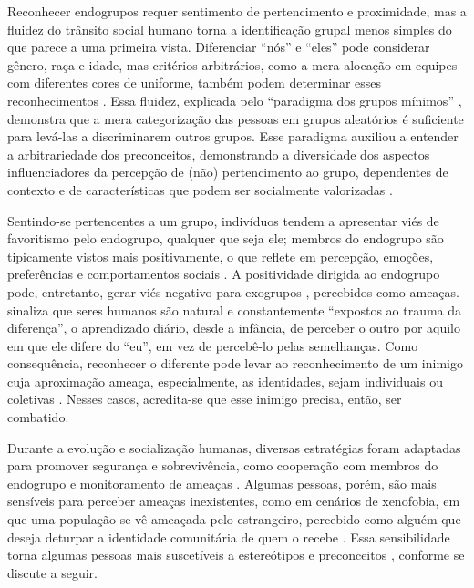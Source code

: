 \documentclass[portuguese]{textolivre}
\begin{document}
Reconhecer endogrupos requer sentimento de pertencimento e proximidade, mas a fluidez do trânsito social humano torna a identificação grupal menos simples do que parece a uma primeira vista. Diferenciar “nós” e “eles” pode considerar gênero, raça e idade, mas critérios arbitrários, como a mera alocação em equipes com diferentes cores de uniforme, também podem determinar esses reconhecimentos \cite{van2008neural}. Essa fluidez, explicada pelo “paradigma dos grupos mínimos” \cite{tajfel1974social}, demonstra que a mera categorização das pessoas em grupos aleatórios é suficiente para levá-las a discriminarem outros grupos. Esse paradigma auxiliou a entender a arbitrariedade dos preconceitos, demonstrando a diversidade dos aspectos influenciadores da percepção de (não) pertencimento ao grupo, dependentes de contexto e de características que podem ser socialmente valorizadas \cite{cikara2022hate}.

Sentindo-se pertencentes a um grupo, indivíduos tendem a apresentar viés de favoritismo pelo endogrupo, qualquer que seja ele; membros do endogrupo são tipicamente vistos mais positivamente, o que reflete em percepção, emoções, preferências e comportamentos sociais \cite{liberman2017origins}. A positividade dirigida ao endogrupo pode, entretanto, gerar viés negativo para exogrupos \cite{brewer2016intergroup}, percebidos como ameaças. \textcite[p.43]{eco2020migraccao} sinaliza que seres humanos são natural e constantemente “expostos ao trauma da diferença”, o aprendizado diário, desde a infância, de perceber o outro por aquilo em que ele difere do “eu”, em vez de percebê-lo pelas semelhanças. Como consequência, reconhecer o diferente pode levar ao reconhecimento de um inimigo cuja aproximação ameaça, especialmente, as identidades, sejam individuais ou coletivas \cite{eco2021construir, eco2022}. Nesses casos, acredita-se que esse inimigo precisa, então, ser combatido.

Durante a evolução e socialização humanas, diversas estratégias foram adaptadas para promover segurança e sobrevivência, como cooperação com membros do endogrupo e monitoramento de ameaças \cite{schaller2010}. Algumas pessoas, porém, são mais sensíveis para perceber ameaças inexistentes, como em cenários de xenofobia, em que uma população se vê ameaçada pelo estrangeiro, percebido como alguém que deseja deturpar a identidade comunitária de quem o recebe \cite{eco2020migraccao}. Essa sensibilidade torna algumas pessoas mais suscetíveis a estereótipos e preconceitos \cite{neuberg2015}, conforme se discute a seguir.
\end{document}
